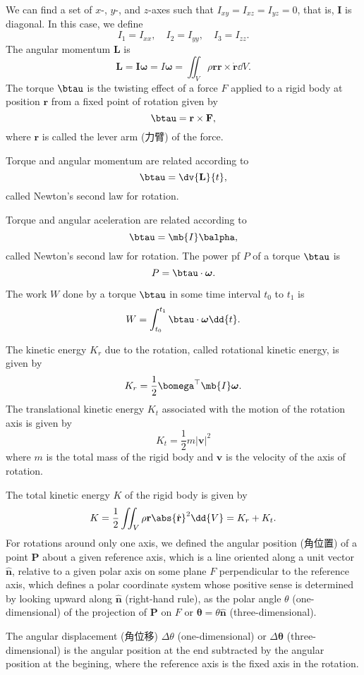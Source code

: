 \documentclass[a4paper,12pt]{article}
\begin{document}
We can find a set of $x$-, $y$-, and $z$-axes such that $I_{xy}=I_{xz}=I_{yz}=0$, that is, $\mathbf{I}$ is diagonal. In this case, we define
\[I_1=I_{xx},\quad I_2=I_{yy}, \quad I_3=I_{zz}.\]
The angular momentum $\mathbf{L}$ is
\[\mathbf{L}=\mathbf{I}\boldsymbol{\omega}=I\boldsymbol{\omega}=\iint_V\rho{\mathbf{r}}\mathbf{r}\times\dot{\mathbf{r}}\dd{V}.\]
The torque $\btau$ is the twisting effect of a force $F$ applied to a rigid body at position $\mathbf{r}$ from a fixed point of rotation given by
\[\btau=\mathbf{r}\times\mathbf{F},\]
where $\mathbf{r}$ is called the lever arm (力臂) of the force.

Torque and angular momentum are related according to
\[\btau=\dv{\mathbf{L}}{t},\]
called Newton's second law for rotation.

Torque and angular aceleration are related according to
\[\btau=\mb{I}\balpha,\]
called Newton's second law for rotation.
The power pf $P$ of a torque $\btau$ is
\[P=\btau\cdot\boldsymbol{\omega}.\]

The work $W$ done by a torque $\btau$ in some time interval $t_0$ to $t_1$ is
\[W=\int_{t_0}^{t_1}\btau\cdot\boldsymbol{\omega}\dd{t}.\]

The kinetic energy $K_r$ due to the rotation, called rotational kinetic energy, is given by
\[K_r=\frac{1}{2}\bomega^\top\mb{I}\boldsymbol{\omega}.\]
The translational kinetic energy $K_t$ associated with the motion of the rotation axis is given by
\[K_t=\frac{1}{2}m|\mathbf{v}|^2\]
where $m$ is the total mass of the rigid body and $\mathbf{v}$ is the velocity of the axis of rotation.

The total kinetic energy $K$ of the rigid body is given by
\[K=\frac{1}{2}\iint_V\rho{\mathbf{r}}\abs{\dot{\mathbf{r}}}^2\dd{V}=K_r+K_t.\]
For rotations around only one axis, we defined the angular position (角位置) of a point $\mathbf{P}$ about a given reference axis, which is a line oriented along a unit vector $\hat{\mathbf{n}}$, relative to a given polar axis on some plane $F$ perpendicular to the reference axis, which defines a polar coordinate system whose positive sense is determined by looking upward along $\hat{\mathbf{n}}$ (right-hand rule), as the polar angle $\theta$ (one-dimensional) of the projection of $\mathbf{P}$ on $F$ or $\boldsymbol{\theta}=\theta\hat{\mathbf{n}}$ (three-dimensional).

The angular displacement (角位移) $\Delta\theta$ (one-dimensional) or $\Delta\boldsymbol{\theta}$ (three-dimensional) is the angular position at the end subtracted by the angular position at the begining, where the reference axis is the fixed axis in the rotation.
\end{document}
